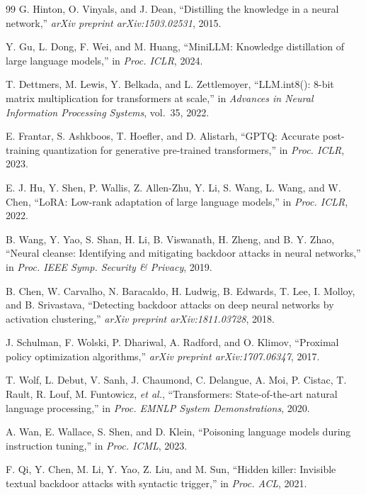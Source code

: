 \documentclass[conference,compsoc]{IEEEtran}
\begin{document}
\begin{thebibliography}{99}
G. Hinton, O. Vinyals, and J. Dean, ``Distilling the knowledge in a neural network,'' \textit{arXiv preprint arXiv:1503.02531}, 2015.

Y. Gu, L. Dong, F. Wei, and M. Huang, ``MiniLLM: Knowledge distillation of large language models,'' in \textit{Proc. ICLR}, 2024.

T. Dettmers, M. Lewis, Y. Belkada, and L. Zettlemoyer, ``LLM.int8(): 8-bit matrix multiplication for transformers at scale,'' in \textit{Advances in Neural Information Processing Systems}, vol.\ 35, 2022.

E. Frantar, S. Ashkboos, T. Hoefler, and D. Alistarh, ``GPTQ: Accurate post-training quantization for generative pre-trained transformers,'' in \textit{Proc. ICLR}, 2023.

E. J. Hu, Y. Shen, P. Wallis, Z. Allen-Zhu, Y. Li, S. Wang, L. Wang, and W. Chen, ``LoRA: Low-rank adaptation of large language models,'' in \textit{Proc. ICLR}, 2022.

B. Wang, Y. Yao, S. Shan, H. Li, B. Viswanath, H. Zheng, and B. Y. Zhao, ``Neural cleanse: Identifying and mitigating backdoor attacks in neural networks,'' in \textit{Proc. IEEE Symp. Security \& Privacy}, 2019.

B. Chen, W. Carvalho, N. Baracaldo, H. Ludwig, B. Edwards, T. Lee, I. Molloy, and B. Srivastava, ``Detecting backdoor attacks on deep neural networks by activation clustering,'' \textit{arXiv preprint arXiv:1811.03728}, 2018.

J. Schulman, F. Wolski, P. Dhariwal, A. Radford, and O. Klimov, ``Proximal policy optimization algorithms,'' \textit{arXiv preprint arXiv:1707.06347}, 2017.

T. Wolf, L. Debut, V. Sanh, J. Chaumond, C. Delangue, A. Moi, P. Cistac, T. Rault, R. Louf, M. Funtowicz, \textit{et al.}, ``Transformers: State-of-the-art natural language processing,'' in \textit{Proc. EMNLP System Demonstrations}, 2020.

A. Wan, E. Wallace, S. Shen, and D. Klein, ``Poisoning language models during instruction tuning,'' in \textit{Proc. ICML}, 2023.

F. Qi, Y. Chen, M. Li, Y. Yao, Z. Liu, and M. Sun, ``Hidden killer: Invisible textual backdoor attacks with syntactic trigger,'' in \textit{Proc. ACL}, 2021.


\end{thebibliography}
\end{document}
